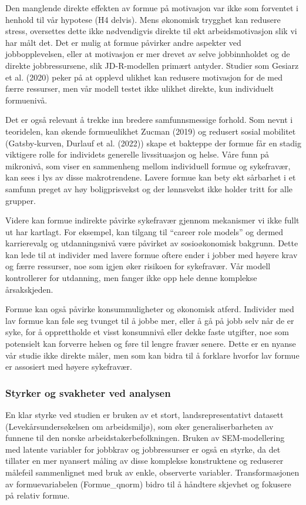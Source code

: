 \documentclass[
  12pt,
  a4paper,
  DIV=11,
  numbers=noendperiod]{scrartcl}
\begin{document}
Den manglende direkte effekten av formue på motivasjon var ikke som
forventet i henhold til vår hypotese (H4 delvis). Mens økonomisk
trygghet kan redusere stress, oversettes dette ikke nødvendigvis direkte
til økt arbeidsmotivasjon slik vi har målt det. Det er mulig at formue
påvirker andre aspekter ved jobbopplevelsen, eller at motivasjon er mer
drevet av selve jobbinnholdet og de direkte jobbressursene, slik
JD-R-modellen primært antyder. Studier som Gesiarz et al. (2020) peker
på at opplevd ulikhet kan redusere motivasjon for de med færre
ressurser, men vår modell testet ikke ulikhet direkte, kun individuelt
formuenivå.

Det er også relevant å trekke inn bredere samfunnsmessige forhold. Som
nevnt i teoridelen, kan økende formueulikhet Zucman (2019) og redusert
sosial mobilitet (Gatsby-kurven, Durlauf et al. (2022)) skape et
bakteppe der formue får en stadig viktigere rolle for individets
generelle livssituasjon og helse. Våre funn på mikronivå, som viser en
sammenheng mellom individuell formue og sykefravær, kan sees i lys av
disse makrotrendene. Lavere formue kan bety økt sårbarhet i et samfunn
preget av høy boligprisvekst og der lønnsvekst ikke holder tritt for
alle grupper.

Videre kan formue indirekte påvirke sykefravær gjennom mekanismer vi
ikke fullt ut har kartlagt. For eksempel, kan tilgang til ``career role
models'' og dermed karrierevalg og utdanningsnivå være påvirket av
sosioøkonomisk bakgrunn. Dette kan lede til at individer med lavere
formue oftere ender i jobber med høyere krav og færre ressurser, noe som
igjen øker risikoen for sykefravær. Vår modell kontrollerer for
utdanning, men fanger ikke opp hele denne komplekse årsakskjeden.

Formue kan også påvirke konsummuligheter og økonomisk atferd. Individer
med lav formue kan føle seg tvunget til å jobbe mer, eller å gå på jobb
selv når de er syke, for å opprettholde et visst konsumnivå eller dekke
faste utgifter, noe som potensielt kan forverre helsen og føre til
lengre fravær senere. Dette er en nyanse vår studie ikke direkte måler,
men som kan bidra til å forklare hvorfor lav formue er assosiert med
høyere sykefravær.

\subsubsection{Styrker og svakheter ved
analysen}\label{styrker-og-svakheter-ved-analysen}

En klar styrke ved studien er bruken av et stort, landsrepresentativt
datasett (Levekårsundersøkelsen om arbeidsmiljø), som øker
generaliserbarheten av funnene til den norske arbeidstakerbefolkningen.
Bruken av SEM-modellering med latente variabler for jobbkrav og
jobbressurser er også en styrke, da det tillater en mer nyansert måling
av disse komplekse konstruktene og reduserer målefeil sammenlignet med
bruk av enkle, observerte variabler. Transformasjonen av
formuevariabelen (Formue\_qnorm) bidro til å håndtere skjevhet og
fokusere på relativ formue.
\end{document}
